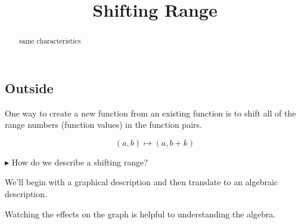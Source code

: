 \documentclass{ximera}
\title{Shifting Range}
\begin{document}
\begin{abstract}
same characteristics
\end{abstract}
\maketitle










\subsection*{Outside}



One way to create a new function from an existing function is to shift all of the range numbers (function values) in the function pairs. 

\[
(a, b) \mapsto (a, b + k)
\]



\textbf{\textcolor{blue!55!black}{$\blacktriangleright$}} How do we describe a shifting range? 

We'll begin with a graphical description and then translate to an algebraic description. 



Watching the effects on the graph is helpful to understanding the algebra.
\end{document}
